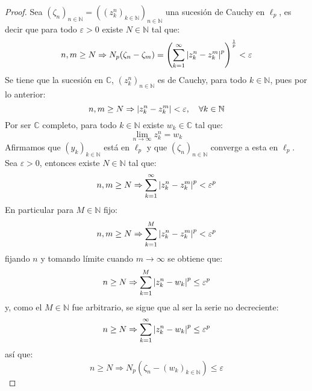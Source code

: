 \documentclass[twoside,12pt,a4 paper,openright]{book}
\begin{document}
\begin{enumerate}
    \begin{proof}
        Sea $\left(\zeta_n \right)_{ n\in\mathbb{N}}=\left(\left(z_k^n \right)_{ k\in\mathbb{N}} \right)_{ n\in\mathbb{N}}$ una sucesi\'on de Cauchy en $\ell_p$, es decir que para todo $\varepsilon>0$ existe $N\in\mathbb{N}$ tal que:
        \begin{equation*}
            n,m\geq N\Rightarrow N_p(\zeta_n-\zeta_m)=\left(\sum_{ k=1}^\infty\left|z_k^n-z_k^m\right|^p\right)^{\frac{1}{p}} <\varepsilon
        \end{equation*}
        Se tiene que la sucesi\'on en $\mathbb{C}$, $\left(z_k^n \right)_{ n\in\mathbb{N}}$ es de Cauchy, para todo $k\in\mathbb{N}$, pues por lo anterior:
        \begin{equation*}
            n,m\geq N\Rightarrow\left|z_k^n-z_k^m\right|<\varepsilon,\quad\forall k\in\mathbb{N}
        \end{equation*}
        Por ser $\mathbb{C}$ completo, para todo $k\in\mathbb{N}$ existe $w_k\in\mathbb{C}$ tal que:
        \begin{equation*}
            \lim_{n\rightarrow\infty}z_k^n=w_k
        \end{equation*}
        Afirmamos que $\left( y_k\right)_{ k\in\mathbb{N}}$ est\'a en $\ell_p$ y que $\left(\zeta_n \right)_{ n\in\mathbb{N}}$ converge a esta en $\ell_p$. Sea $\varepsilon>0$, entonces existe $N\in\mathbb{N}$ tal que:
        \begin{equation*}
            n,m\geq N\Rightarrow\sum_{ k=1}^\infty\left|z_k^n-z_k^m\right|^p<\varepsilon^p
        \end{equation*}
        En particular para $M\in\mathbb{N}$ fijo:
        \begin{equation*}
            n,m\geq N\Rightarrow\sum_{ k=1}^M\left|z_k^n-z_k^m\right|^p<\varepsilon^p
        \end{equation*}
        fijando $n$ y tomando l\'imite cuando $m\rightarrow\infty$ se obtiene que:
        \begin{equation*}
            n\geq N\Rightarrow\sum_{ k=1}^M\left|z_k^n-w_k\right|^p\leq\varepsilon^p
        \end{equation*}
        y, como el $M\in\mathbb{N}$ fue arbitrario, se sigue que al ser la serie no decreciente:
        \begin{equation*}
            n\geq N\Rightarrow\sum_{ k=1}^\infty\left|z_k^n-w_k\right|^p\leq\varepsilon^p
        \end{equation*}
        as\'i que:
        \begin{equation*}
            n\geq N\Rightarrow N_p(\zeta_n-\left(w_k\right)_{ k\in\mathbb{N}})\leq\varepsilon

\end{equation*}
\end{proof}
\end{enumerate}
\end{document}

